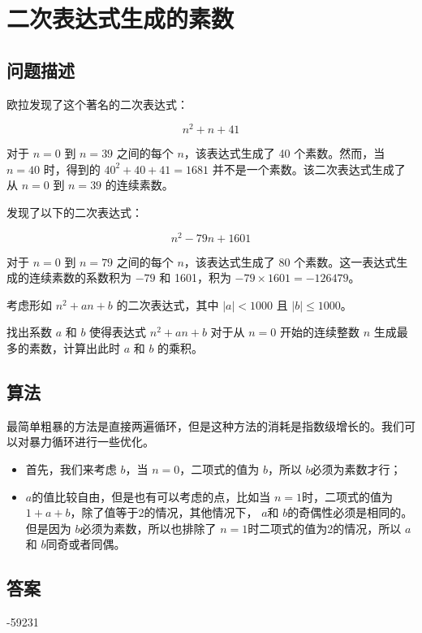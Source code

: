 \section{二次表达式生成的素数}\label{sec:problem27}
\subsection{问题描述}
\begin{tcolorbox}
欧拉发现了这个著名的二次表达式：

\[
n^2 + n + 41
\]

对于 \( n = 0 \) 到 \( n = 39 \) 之间的每个 \( n \)，该表达式生成了 40 个素数。然而，当 \( n = 40 \) 时，得到的 \( 40^2 + 40 + 41 = 1681 \) 并不是一个素数。该二次表达式生成了从 \( n = 0 \) 到 \( n = 39 \) 的连续素数。

发现了以下的二次表达式：

\[
n^2 - 79n + 1601
\]

对于 \( n = 0 \) 到 \( n = 79 \) 之间的每个 \( n \)，该表达式生成了 80 个素数。这一表达式生成的连续素数的系数积为 \( -79 \) 和 1601，积为 \( -79 \times 1601 = -126479 \)。

考虑形如 \( n^2 + an + b \) 的二次表达式，其中 \( |a| < 1000 \) 且 \( |b| \leq 1000 \)。

找出系数 \( a \) 和 \( b \) 使得表达式 \( n^2 + an + b \) 对于从 \( n = 0 \) 开始的连续整数 \( n \) 生成最多的素数，计算出此时 \( a \) 和 \( b \) 的乘积。

\end{tcolorbox}

\subsection{算法}
最简单粗暴的方法是直接两遍循环，但是这种方法的消耗是指数级增长的。我们可以对暴力循环进行一些优化。

\begin{itemize}
  \item 首先，我们来考虑 \( b \)，当 \( n = 0 \)，二项式的值为 \( b \)，所以 \( b \)必须为素数才行；
  \item \( a \)的值比较自由，但是也有可以考虑的点，比如当 \( n = 1 \)时，二项式的值为 \( 1 + a + b
    \)，除了值等于2的情况，其他情况下， \( a \)和 \( b \)的奇偶性必须是相同的。但是因为 \( b \)必须为素数，所以也排除了
    \( n = 1 \)时二项式的值为2的情况，所以 \( a \)和 \( b \)同奇或者同偶。
\end{itemize}

\subsection{答案}
-59231
